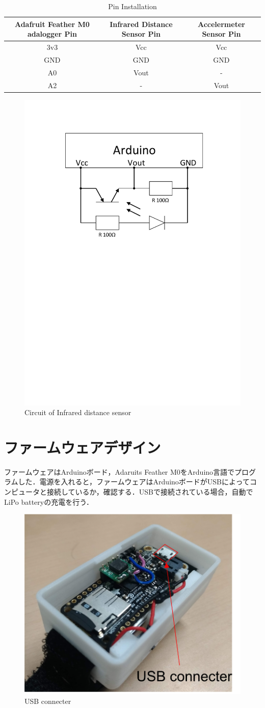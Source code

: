 \begin{table}[H]
  \caption{Pin Installation}
  \centering
  \begin{tabular}{ccc}
    \hline
    Adafruit Feather M0 adalogger Pin & Infrared Distance Sensor Pin & Accelermeter Sensor Pin\\
    \hline \hline
    3v3 & Vcc & Vcc  \\
    GND & GND & GND  \\
    A0  & Vout& - \\
    A2  & -& Vout \\
    \hline
  \end{tabular}
   \label{table:pin}
\end{table}

\begin{figure}[H]
  \centering
  \includegraphics[width=0.5\linewidth]{fig/test}
  \caption{Circuit of Infrared distance sensor }
  \label{fig:circuit}{}
\end{figure}


\section{ファームウェアデザイン}
ファームウェアはArduinoボード，Adaruits Feather M0をArduino言語でプログラムした．電源を入れると，ファームウェアはArduinoボードがUSBによってコンピュータと接続しているか，確認する．USBで接続されている場合，自動でLiPo batteryの充電を行う．

\begin{figure}[H]
  \centering
  \includegraphics[width=0.5\linewidth]{fig/usbconne}
  \caption{USB connecter}
  \label{fig:USB connecter}
\end{figure}


